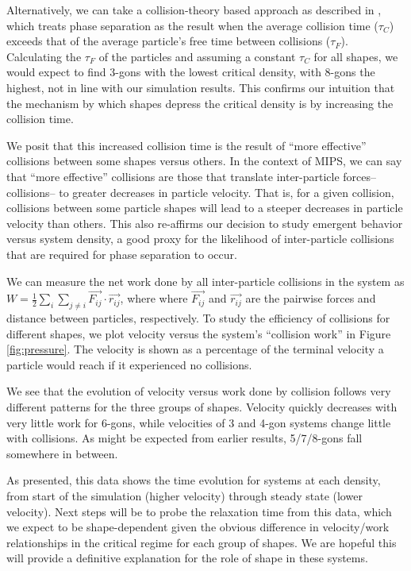 Alternatively, we can take a collision-theory based approach as described in \cite{Bruss_2017_arxiv}, which treats phase separation as the result when the average collision time ($\tau_C$) exceeds that of the average particle's free time between collisions ($\tau_F$).
Calculating the $\tau_F$ of the particles and assuming a constant $\tau_C$ for all shapes, we would expect to find 3-gons with the lowest critical density, with 8-gons the highest, not in line with our simulation results.
This confirms our intuition that the mechanism by which shapes depress the critical density is by increasing the collision time.

We posit that this increased collision time is the result of ``more effective'' collisions between some shapes versus others.
In the context of MIPS, we can  say that ``more effective'' collisions are those that translate inter-particle forces-- collisions-- to greater decreases in particle velocity.
That is, for a given collision, collisions between some particle shapes will lead to a steeper decreases in particle velocity than others.  
This also re-affirms our decision to study emergent behavior versus system density, a good proxy for the likelihood of inter-particle collisions that are required for phase separation to occur.

We can measure the net work done by all inter-particle collisions in the system as $ W = \frac{1}{2}\sum_i\sum_{j{\neq}i} \vec{F_{ij}}{\cdot}\vec{r_{ij}} $, where where $\vec{F_{ij}}$ and $\vec{r_{ij}}$ are the pairwise forces and distance between particles, respectively.
To study the efficiency of collisions for different shapes, we plot velocity versus the system's ``collision work'' in Figure \ref{fig:pressure}.
The velocity is shown as a percentage of the terminal velocity a particle would reach if it experienced no collisions.

We see that the evolution of velocity versus work done by collision follows very different patterns for the three groups of shapes.
Velocity quickly decreases with very little work for 6-gons, while velocities of 3 and 4-gon systems change little with collisions.
As might be expected from earlier results, 5/7/8-gons fall somewhere in between.

As presented, this data shows the time evolution for systems at each density, from start of the simulation (higher velocity) through steady state (lower velocity).
Next steps will be to probe the relaxation time from this data, which we expect to be shape-dependent given the obvious difference in velocity/work relationships in the critical regime for each group of shapes.
We are hopeful this will provide a definitive explanation for the role of shape in these systems.

